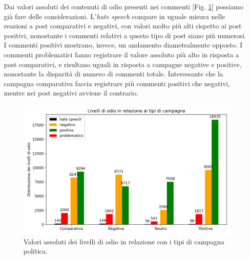 Dai valori assoluti dei contenuti di odio presenti nei commenti  [Fig. \ref{fig:hate}] possiamo già fare delle considerazioni. L'\textit{hate speech} compare in uguale misura nelle reazioni a post comparativi e negativi, con valori molto più alti rispetto ai post positivi, nonostante i commenti relativi a questo tipo di post siano più numerosi. I commenti positivi mostrano, invece, un andamento diametralmente opposto. I commenti problematici fanno registrare il valore assoluto più alto in risposta a post comparativi, e risultano uguali in risposta a campagne negative e positive, nonostante la disparità di numero di commenti totale. Interessante che la campagna comparativa faccia registrare più commenti positivi che negativi, mentre nei post negativi avviene il contrario.
\begin{figure}
	\includegraphics[width=\textwidth]{figures/hate}
	\caption{Valori assoluti dei livelli di odio in relazione con i tipi di campagna politica.}
	\label{fig:hate}
\end{figure}


